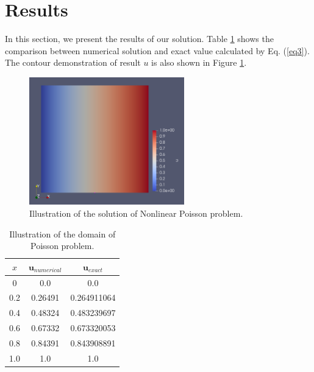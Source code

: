 \documentclass[]{article}
\begin{document}
\section{Results} \label{sec: rst}
In this section, we present the results of our solution. Table \ref{tab1} shows the comparison between numerical solution and exact value calculated by Eq. (\ref{eq3}). The contour demonstration of result $u$ is also shown in Figure \ref{fig_Rs}.

\begin{figure}[htbp]
	\centering
	\includegraphics[width=0.6\textwidth]{Figures/result.png}
	\caption{Illustration of the solution of Nonlinear Poisson problem.}
	\label{fig_Rs}
\end{figure}
\begin{table}
	\caption{Illustration of the domain of Poisson problem.}
	\label{tab1}
\begin{center}
	\begin{tabular}{|c| c| c|} 
		\hline
		$x$ & $\mathbf{u}_{numerical}$ & $\mathbf{u}_{exact}$ \\ [0.7ex] 
		\hline\hline
		0 & 0.0 & 0.0 \\  [0.2ex] 
		\hline
		0.2 & 0.26491 & 0.264911064 \\ [0.2ex] 
		\hline
		0.4 & 0.48324 & 0.483239697 \\ [0.2ex] 
		\hline
		0.6 & 0.67332 & 0.673320053 \\ [0.2ex] 
		\hline
		0.8 & 0.84391 & 0.843908891 \\ [0.2ex] 
		\hline
		1.0 & 1.0 & 1.0 \\ [0.2ex] 
		\hline
	\end{tabular}
\end{center}
\end{table}
 


\end{document}
